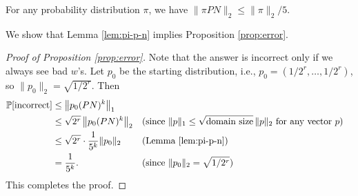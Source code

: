 \documentclass[letterpaper, reqno,11pt]{article}
\newcommand{\PP}{\mathop{{}\mathbb{P}}}
\begin{document}
\begin{lemma} \label{lem:pi-p-n}
  For any probability distribution $\pi$, we have $\| \pi PN \|_2 \leq \| \pi \|_2/5$.
\end{lemma}

We show that Lemma \ref{lem:pi-p-n} implies Proposition \ref{prop:error}.

\begin{proof}[Proof of Proposition \ref{prop:error}]
  Note that the answer is incorrect only if we always see bad $w$'s. Let $p_0$ be the starting distribution, i.e., $p_0 = (1/2^r, \ldots, 1/2^r)$, so $\| p_0 \|_2 = \sqrt{1/2^r}$. Then
  \begin{align*}
    \PP[\text{incorrect}] &\leq \left\| p_0 (PN)^k \right\|_1 \\
    &\leq \sqrt{2^r} \left\| p_0 (PN)^k \right\|_2 && \text{(since $\| p \|_1 \leq \sqrt{\text{domain size}} \, \| p \|_2$ for any vector $p$)} \\
    &\leq \sqrt{2^r} \cdot \frac{1}{5^k} \| p_0 \|_2 && \text{(Lemma \ref{lem:pi-p-n})} \\
    &= \frac{1}{5^k}. && \text{(since $\| p_0 \|_2 = \sqrt{1/2^r}$)}
  \end{align*}
  This completes the proof.
\end{proof}
\end{document}
